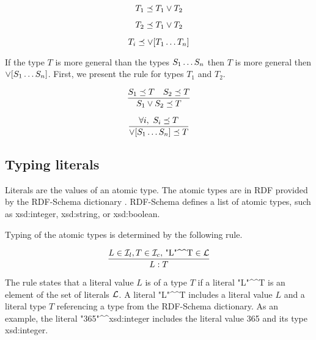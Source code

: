 \documentclass[runningheads]{llncs}
\newcommand{\Lt}{{\cal L}}
\newcommand{\I}{{\cal I}}
\begin{document}
\begin{equation}
T_1\preceq\/T_1\lor\/T_2    
\end{equation}

\begin{equation}
T_2\preceq\/T_1\lor\/T_2  
\end{equation}

\begin{equation}
T_i\preceq\/\lor[T_1\ldots\/T_n]  
\end{equation}

If the type $T$ is more general than the types $S_1\ldots\/S_n$ then
$T$ is more general then $\lor[S_1\ldots\/S_n]$. First, we present
the rule for types $T_1$ and $T_2$.

\begin{equation}
\dfrac{S_1\preceq\/T\quad\/S_2\preceq\/\/T}
      {S_1\lor\/S_2\preceq\/T}  
\end{equation}

\begin{equation}
\dfrac{\forall i,\ S_i\preceq\/T}
      {\lor[S_1\ldots\/S_n]\preceq\/T}  
\end{equation}



\subsection{Typing literals\label{section:literals}}

Literals are the values of an atomic type. The atomic types are in RDF
provided by the RDF-Schema dictionary \cite{rdfschema}. RDF-Schema
defines a list of atomic types, such as xsd:integer, xsd:string, or
xsd:boolean.

Typing of the atomic types is determined by the following rule.

\begin{equation}
\dfrac{L\in\I_l, T\in\I_c,\, \text{"L"\textasciicircum\textasciicircum\/T}\in\Lt}
      {L:T}  
\end{equation}

The rule states that a literal value $L$ is of a type $T$ if a literal
"L"\textasciicircum\textasciicircum\/T is an element of the set of
literals $\Lt$. A literal "L"\textasciicircum\textasciicircum\/T
includes a literal value $L$ and a literal type $T$ referencing a type
from the RDF-Schema dictionary. As an example, the literal
"365"\textasciicircum\textasciicircum\/xsd:integer includes the
literal value 365 and its type xsd:integer.
\end{document}
